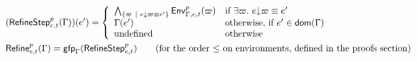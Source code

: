 \documentclass[a4paper]{article}
\theoremstyle{definition}
\begin{document}
    \begin{align*}
      &(\textsf{RefineStep}^{p}_{e,t} (\Gamma))(e') = 
        \left\{\begin{array}{ll}
          \bigwedge_{\{\varpi ~|~ e{\downarrow}\varpi \equiv e'\}}
          \textsf{Env}^{p}_{\Gamma,e,t} (\varpi) & \text{if } \exists \varpi.\ e{\downarrow}\varpi \equiv e' \\
          \Gamma(e') & \text{otherwise, if } e' \in \textsf{dom}(\Gamma)\\
          \text{undefined} & \text{otherwise}
        \end{array}\right.\\
      &\textsf{Refine}^{p}_{e,t}(\Gamma)=\textsf{gfp}_\Gamma (\textsf{RefineStep}^{p}_{e,t})\qquad \text{(for the order $\leq$ on environments, defined in the proofs section)}
    \end{align*}
\end{document}
